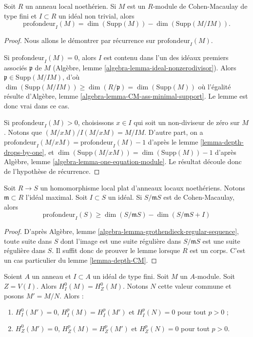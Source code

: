 \begin{lemma}
\label{lemma-depth-CM}
Soit $R$ un anneau local noethérien. Si $M$ est un
$R$-module de Cohen-Macaulay de type fini et $I \subset R$ un idéal non trivial, alors
$$
\text{profondeur}_I(M) = \dim(\text{Supp}(M)) - \dim(\text{Supp}(M/IM)).
$$
\end{lemma}

\begin{proof}
Nous allons le démontrer par récurrence sur $\text{profondeur}_I(M)$.

\medskip\noindent
Si $\text{profondeur}_I(M) = 0$, alors $I$ est contenu dans l'un des idéaux premiers
associés $\mathfrak p$ de $M$ (Algèbre, lemme \ref{algebra-lemma-ideal-nonzerodivisor}).
Alors $\mathfrak p \in \text{Supp}(M/IM)$, d'où
$\dim(\text{Supp}(M/IM)) \geq \dim(R/\mathfrak p) = \dim(\text{Supp}(M))$
où l'égalité résulte d'Algèbre, lemme \ref{algebra-lemma-CM-ass-minimal-support}.
Le lemme est donc vrai dans ce cas.

\medskip\noindent
Si $\text{profondeur}_I(M) > 0$, choisissons $x \in I$ qui soit un non-diviseur de zéro sur $M$.
Notons que $(M/xM)/I(M/xM) = M/IM$. D'autre part, on a
$\text{profondeur}_I(M/xM) = \text{profondeur}_I(M) - 1$
d'après le lemme \ref{lemma-depth-drops-by-one}, et $\dim(\text{Supp}(M/xM)) = \dim(\text{Supp}(M)) -  1$
d'après Algèbre, lemme \ref{algebra-lemma-one-equation-module}.
Le résultat découle donc de l'hypothèse de récurrence.
\end{proof}

\begin{lemma}
\label{lemma-depth-flat-CM}
Soit $R \to S$ un homomorphisme local plat d'anneaux locaux noethériens.
Notons $\mathfrak m \subset R$ l'idéal maximal.
Soit $I \subset S$ un idéal.
Si $S/\mathfrak mS$ est de Cohen-Macaulay, alors
$$
\text{profondeur}_I(S) \geq \dim(S/\mathfrak mS) - \dim(S/\mathfrak mS + I)
$$
\end{lemma}

\begin{proof}
D'après Algèbre, lemme \ref{algebra-lemma-grothendieck-regular-sequence}, toute suite dans $S$
dont l'image est une suite régulière dans $S/\mathfrak mS$
est une suite régulière dans $S$.
Il suffit donc de prouver le lemme lorsque $R$ est un corps.
C'est un cas particulier du lemme \ref{lemma-depth-CM}.
\end{proof}

\begin{lemma}
\label{lemma-divide-by-torsion}
Soient $A$ un anneau et $I \subset A$ un idéal de type fini.
Soit $M$ un $A$-module. Soit $Z = V(I)$.
Alors $H^0_I(M) = H^0_Z(M)$. Notons $N$ cette valeur commune
et posons $M' = M/N$. Alors :
\begin{enumerate}
\item $H^0_I(M') = 0$, $H^p_I(M) = H^p_I(M')$ et $H^p_I(N) = 0$
pour tout $p > 0$ ;
\item $H^0_Z(M') = 0$, $H^p_Z(M) = H^p_Z(M')$ et $H^p_Z(N) = 0$
pour tout $p > 0$.
\end{enumerate}
\end{lemma}

